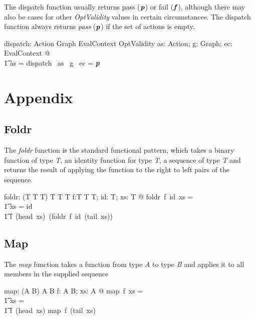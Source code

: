 \documentclass[fuzz]{llncs}
\def\pass{\textbf{\textit{p}}}
\def\fail{\textbf{\textit{f}}}
\def\zc{\textit}
\begin{document}
The dispatch function usually returns pass ($\pass$) or fail ($\fail$), although there may also be cases for other \zc{OptValidity} values in certain circumstances. The dispatch function
always returns \zc{pass} ($\pass$) if the set of actions is empty.
\begin{zed}
[Action]
\end{zed}
\begin{gendef}
   dispatch: \power Action \fun Graph \fun EvalContext \fun OptValidity
\where
   \forall as: \power Action; g: Graph; ec: EvalContext @ \\
\t1 as = \emptyset \implies dispatch~ as~ g ~ec = \pass
\end{gendef}


\section{Appendix}
\subsection{Foldr}
The \zc{foldr} function is the standard functional pattern, which takes a binary function
of type \zc{T}, an identity function for type \zc{T}, a sequence of type \zc{T} and returns
the result of applying the function to the right to left pairs of the sequence.
\begin{gendef}[T]
   foldr: (T \fun T \fun T) \fun T \fun \seq T \fun T
\where
   \forall f:T \fun T \fun T; id: T; xs: \seq T @ foldr~f~id~xs = \\
\t1 \IF xs = \langle \rangle \THEN id \\
\t1 \ELSE f~(head~xs)~(foldr~f~id~(tail~xs))
\end{gendef}

\subsection{Map}
The \zc{map} function takes a function from type \zc{A} to type \zc{B} and applies it to
all members in the supplied sequence
\begin{gendef}[A,B]
   map: (A \fun B) \fun \seq A \fun \seq B
\where
   \forall f: A \fun B; xs: \seq A @ map~f~xs = \\
\t1 \IF xs = \langle \rangle \THEN \langle \rangle \\
\t1 \ELSE \langle f~(head~xs) \rangle \cat map~f~(tail~xs)
\end{gendef}
\end{document}
